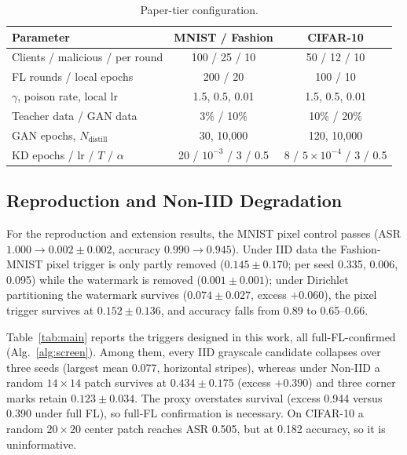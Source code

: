 \documentclass[conference]{IEEEtran}
\begin{document}
\begin{table}[t]
\centering
\caption{Paper-tier configuration.}
\label{tab:hp}
\footnotesize
\setlength{\tabcolsep}{2pt}
\begin{tabular}{lcc}
\toprule
Parameter & MNIST / Fashion & CIFAR-10 \\
\midrule
Clients / malicious / per round & 100 / 25 / 10 & 50 / 12 / 10 \\
FL rounds / local epochs & 200 / 20 & 100 / 10 \\
$\gamma$, poison rate, local lr & 1.5, 0.5, 0.01 & 1.5, 0.5, 0.01 \\
Teacher data / GAN data & 3\% / 10\% & 10\% / 20\% \\
GAN epochs, $N_{\mathrm{distill}}$ & 30, 10{,}000 & 120, 10{,}000 \\
KD epochs / lr / $T$ / $\alpha$ & 20 / $10^{-3}$ / 3 / 0.5 & 8 / $5{\times}10^{-4}$ / 3 / 0.5 \\
\bottomrule
\end{tabular}
\end{table}

\subsection{Reproduction and Non-IID Degradation}
For the reproduction and extension results, the MNIST pixel control passes (ASR $1.000\to0.002\pm0.002$, accuracy $0.990\to0.945$). Under IID data the Fashion-MNIST pixel trigger is only partly removed ($0.145\pm0.170$; per seed 0.335, 0.006, 0.095) while the watermark is removed ($0.001\pm0.001$); under Dirichlet partitioning the watermark survives ($0.074\pm0.027$, excess $+0.060$), the pixel trigger survives at $0.152\pm0.136$, and accuracy falls from 0.89 to 0.65--0.66.

Table~\ref{tab:main} reports the triggers designed in this work, all full-FL-confirmed (Alg.~\ref{alg:screen}). Among them, every IID grayscale candidate collapses over three seeds (largest mean 0.077, horizontal stripes), whereas under Non-IID a random $14{\times}14$ patch survives at $0.434\pm0.175$ (excess $+0.390$) and three corner marks retain $0.123\pm0.034$. The proxy overstates survival (excess 0.944 versus 0.390 under full FL), so full-FL confirmation is necessary. On CIFAR-10 a random $20{\times}20$ center patch reaches ASR 0.505, but at 0.182 accuracy, so it is uninformative.
\end{document}
